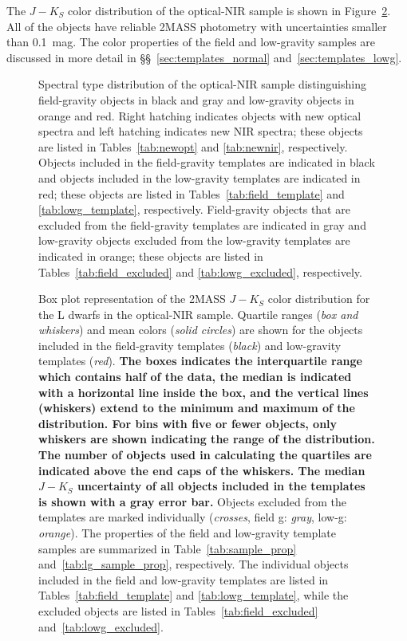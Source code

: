 \documentclass[12pt]{aastex6}
\begin{document}
The $J-K_S$ color distribution of the optical-NIR sample is shown in Figure~\ref{fig:JK_colors}.
All of the objects have reliable 2MASS photometry with uncertainties smaller than 0.1~mag.
The color properties of the field and low-gravity samples are discussed in more detail in \S\S~\ref{sec:templates_normal} and~\ref{sec:templates_lowg}.

\begin{figure}
    \caption{Spectral type distribution of the optical-NIR sample distinguishing field-gravity objects in black and gray and low-gravity objects in orange and red.
    Right hatching indicates objects with new optical spectra and left hatching indicates new NIR spectra; these objects are listed in Tables~\ref{tab:newopt} and \ref{tab:newnir}, respectively.
    Objects included in the field-gravity templates are indicated in black and objects included in the low-gravity templates are indicated in red; these objects are listed in Tables~\ref{tab:field_template} and \ref{tab:lowg_template}, respectively.
    Field-gravity objects that are excluded from the field-gravity templates are indicated in gray and low-gravity objects excluded from the low-gravity templates are indicated in orange; these objects are listed in Tables~\ref{tab:field_excluded} and \ref{tab:lowg_excluded}, respectively.}
  \label{fig:spthist}
\end{figure}

\begin{figure}
    \caption{Box plot representation of the 2MASS $J-K_S$ color distribution for the L dwarfs in the optical-NIR sample.
    Quartile ranges (\emph{box and whiskers}) and mean colors (\emph{solid circles}) are shown for the objects included in the field-gravity templates (\emph{black}) and low-gravity templates (\emph{red}).
    \textbf{The boxes indicates the interquartile range which contains half of the data, the median is indicated with a horizontal line inside the box, and the vertical lines (whiskers) extend to the minimum and maximum of the distribution.
        For bins with five or fewer objects, only whiskers are shown indicating the range of the distribution.
        The number of objects used in calculating the quartiles are indicated above the end caps of the whiskers.
    The median $J-K_S$ uncertainty of all objects included in the templates is shown with a gray error bar.}
    Objects excluded from the templates are marked individually (\emph{crosses}, field g: \emph{gray}, low-g: \emph{orange}).
    The properties of the field and low-gravity template samples are summarized in Table~\ref{tab:sample_prop} and~\ref{tab:lg_sample_prop}, respectively. The individual objects included in the field and low-gravity templates are listed in Tables~\ref{tab:field_template} and \ref{tab:lowg_template}, while the excluded objects are listed in Tables~\ref{tab:field_excluded} and~\ref{tab:lowg_excluded}.}
  \label{fig:JK_colors}
\end{figure}
\clearpage
\end{document}
